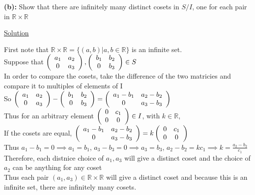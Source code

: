 \documentclass{article} %
\begin{document}
\textbf{(b): }Show that there are infinitely many distinct cosets in $S/I$, one for each pair in $\mathbb{R} \times \mathbb{R}$
\\
\begin{addmargin}[1em]{0em}
\underline{Solution}
\begin{addmargin}[1em]{0em}
First note that $\mathbb{R} \times \mathbb{R} = \{(a,b)|a,b \in \mathbb{R}\}$ is an infinite set.
\\Suppose that $\left( \begin{array}{c c} a_1 & a_2 \\ 0 & a_3 \end{array} \right), \left( \begin{array}{c c} b_1 & b_2 \\ 0 & b_3 \end{array} \right) \in S$
\\In order to compare the cosets, take the difference of the two matricies and compare it to multiples of elements of I
\\So $\left( \begin{array}{c c} a_1 & a_2 \\ 0 & a_3 \end{array} \right) - \left( \begin{array}{c c} b_1 & b_2 \\ 0 & b_3 \end{array} \right) =  \left( \begin{array}{c c} a_1 - b_1 & a_2 - b_2 \\ 0 & a_3 - b_3 \end{array} \right)$
\\Thus for an arbitrary element $ \left( \begin{array}{c c} 0 & c_1 \\ 0 & 0 \end{array} \right) \in I$, with $k \in \mathbb{R}$,
\\If the cosets are equal, $\left( \begin{array}{c c} a_1 - b_1 & a_2 - b_2 \\ 0 & a_3 - b_3 \end{array} \right) = k\left( \begin{array}{c c} 0 & c_1 \\ 0 & 0 \end{array} \right)$
\\Thus $a_1 - b_1 = 0 \implies a_1 = b_1$, $a_3 - b_3 = 0 \implies a_3 = b_3$, $a_2 - b_2 = kc_1 \implies k = \frac{a_2-b_2}{c_1}$
\\Therefore, each distnice choice of $a_1, a_3$ will give a distinct coset and the choice of $a_2$ can be anything for any coset
\\Thus each pair $(a_1, a_3) \in \mathbb{R} \times \mathbb{R}$ will give a distinct coset and because this is an infinite set, there are infinitely many cosets.
\end{addmargin}
\end{addmargin}
\newpage
\end{document}
